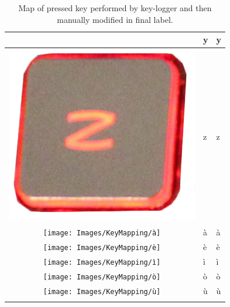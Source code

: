\begin{longtable}{|cll|}
\begin{minipage}[c]{.4\textwidth}
\vspace{0.2cm}
\end{minipage} & y & y\\
\hline
\begin{minipage}[c]{.4\textwidth}
\vspace{0.2cm}
\includegraphics[scale=0.08]{Images/KeyMapping/z}
\vspace{0.2cm}
\end{minipage} & z & z\\
\hline
\begin{minipage}[c]{.4\textwidth}
\vspace{0.2cm}
\texttt{[image: Images/KeyMapping/à]}
\vspace{0.2cm}
\end{minipage} & à & à\\
\hline
\begin{minipage}[c]{.4\textwidth}
\vspace{0.2cm}
\texttt{[image: Images/KeyMapping/è]}
\vspace{0.2cm}
\end{minipage} & è & è\\
\hline
\begin{minipage}[c]{.4\textwidth}
\vspace{0.2cm}
\texttt{[image: Images/KeyMapping/ì]}
\vspace{0.2cm}
\end{minipage} & ì & ì\\
\hline
\begin{minipage}[c]{.4\textwidth}
\vspace{0.2cm}
\texttt{[image: Images/KeyMapping/ò]}
\vspace{0.2cm}
\end{minipage} & ò & ò\\
\hline
\begin{minipage}[c]{.4\textwidth}
\vspace{0.2cm}
\texttt{[image: Images/KeyMapping/ù]}
\vspace{0.2cm}
\end{minipage} & ù & ù\\
\hline
\caption{Map of pressed key performed by key-logger and then manually modified in final label.}
\end{longtable}
\normalsize
